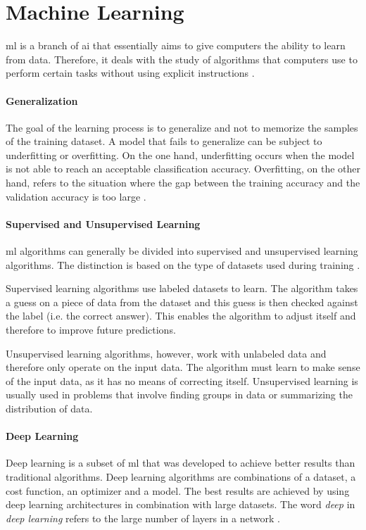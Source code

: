 \section{Machine Learning}
\label{sec:theoretical_background:ml}

\Acrlong{ml} is a branch of \acrlong{ai} that essentially aims to give computers the ability to learn from data.
Therefore, it deals with the study of algorithms that computers use to perform certain tasks without using explicit instructions \cite[p.~97]{deeplearningbook}.

\paragraph{Generalization}
The goal of the learning process is to generalize and not to memorize the samples of the training dataset.
A model that fails to generalize can be subject to underfitting or overfitting.
On the one hand, underfitting occurs when the model is not able to reach an acceptable classification accuracy.
Overfitting, on the other hand, refers to the situation where the gap between the training accuracy and the validation accuracy is too large \cite[p.~108--114]{deeplearningbook}.

\paragraph{Supervised and Unsupervised Learning}
\Acrlong{ml} algorithms can generally be divided into supervised and unsupervised learning algorithms.
The distinction is based on the type of datasets used during training \cite[p.~102--105]{deeplearningbook}.

Supervised learning algorithms use labeled datasets to learn.
The algorithm takes a guess on a piece of data from the dataset and this guess is then checked against the label (i.e. the correct answer).
This enables the algorithm to adjust itself and therefore to improve future predictions.

Unsupervised learning algorithms, however, work with unlabeled data and therefore only operate on the input data.
The algorithm must learn to make sense of the input data, as it has no means of correcting itself.
Unsupervised learning is usually used in problems that involve finding groups in data or summarizing the distribution of data.

\paragraph{Deep Learning}
Deep learning is a subset of \acrlong{ml} that was developed to achieve better results than traditional algorithms.
Deep learning algorithms are combinations of a dataset, a cost function, an optimizer and a model.
The best results are achieved by using deep learning architectures in combination with large datasets.
The word \textit{deep} in \textit{deep learning} refers to the large number of layers in a network \cite[p.~151--152]{deeplearningbook}.
